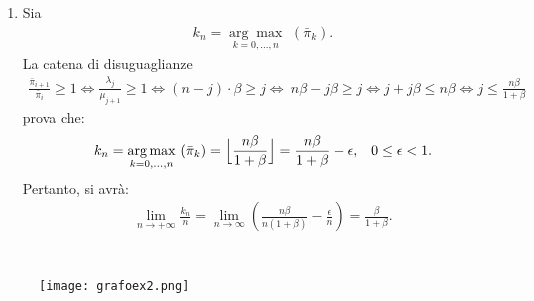 \documentclass[11pt,largemargins]{homework}
\begin{document}
\begin{enumerate}
  \item
  Sia 
  \begin{align*}  
  k_{n}= \underset{k=0,...,n}{\arg\max} \, \, (\bar{\pi}_{k}).
  \end{align*}
  La catena di disuguaglianze
  \begin{align*}
  \frac{\bar{\pi}_{i+1}}{\bar{\pi}_{i}} \geq 1\Leftrightarrow\frac{\lambda_{j}}{\mu_{j+1}}\geq 1\Leftrightarrow(n-j)\cdot\beta\geq j\Leftrightarrow\ n\beta-j\beta \geq j 
  \Leftrightarrow 
  j+j\beta \leq n\beta
 \Leftrightarrow j \leq \frac{n\beta}{1+\beta}
 \end{align*}
 prova che:
 \begin{align*}
k_{n}= \underset{k=0,...,n}{\arg\max} \, \, (\bar{\pi}_{k}) =\Bigl\lfloor\frac{n\beta}{1+\beta}\Bigr\rfloor=\frac{n\beta}{1+\beta}-\epsilon,&& 0\leq \epsilon<1.
 \end{align*} 
 Pertanto, si avrà:
  \begin{align*}
  \lim\limits_{n \rightarrow +\infty}\frac{k_{n}}{n}=\lim\limits_{n \rightarrow \infty}\left(\frac{n\beta}{n\left(1+\beta\right)}-\frac{\epsilon}{n}\right)=\frac{\beta}{1+\beta}.
  \end{align*}
  
    

  \end{enumerate}

  \newpage
\section{}%
 
\begin{figure}[htb]\centering
\texttt{[image: grafoex2.png]}
  \end{figure}
  
\end{document}
